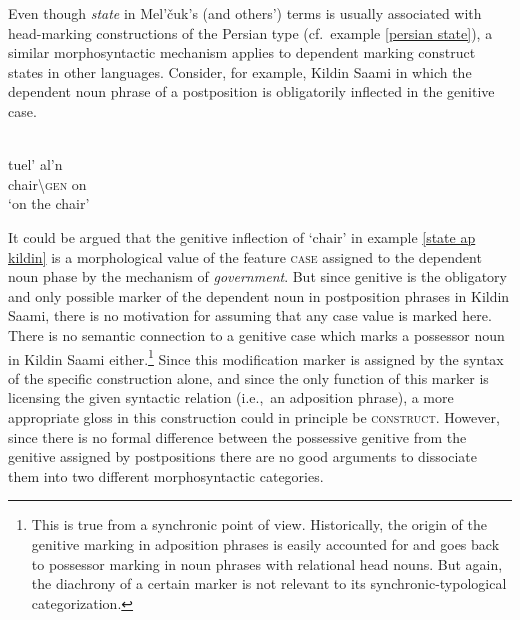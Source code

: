 Even though \emph{state} in Mel'čuk's (and others') terms is usually associated with head-marking constructions of the Persian type (cf.~example \ref{persian state}), a similar morphosyntactic mechanism applies to dependent marking construct states in other languages. Consider, for example, Kildin Saami in which the dependent noun phrase of a postposition is obligatorily inflected in the genitive case.
\begin{exe}
\ex\label{state ap kildin} 
\\
\gll 	tuel'		al'n\\
	chair\textbackslash\textsc{gen}	on\\
\glt 	‘on the chair’
\end{exe}
It could be argued that the genitive inflection of ‘chair’ in example \ref{state ap kildin} is a morphological value of the feature \textsc{case} assigned to the dependent noun phase by the mechanism of \emph{government}. But since genitive is the obligatory and only possible marker of the dependent noun in postposition phrases in Kildin Saami, there is no motivation for assuming that any case value is marked here. There is no semantic connection to a genitive case which marks a possessor noun in Kildin Saami either.\footnote{This is true from a synchronic point of view. Historically, the origin of the genitive marking in adposition phrases is easily accounted for and goes back to possessor marking in noun phrases with relational head nouns. But again, the diachrony of a certain marker is not relevant to its synchronic-typological categorization.} Since this modification marker is assigned by the syntax of the specific construction alone, and since the only function of this marker is licensing the given syntactic relation (i.e.,~an adposition phrase), a more appropriate gloss in this construction could in principle be \textsc{construct}. However, since there is no formal difference between the possessive genitive from the genitive assigned by postpositions there are no good arguments to dissociate them into two different morphosyntactic categories.

